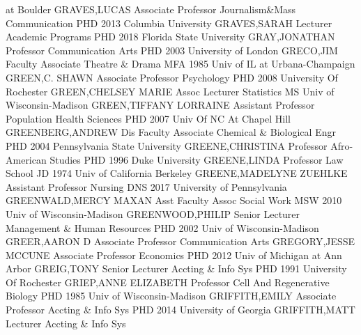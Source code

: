 \documentclass[
]{article}
\begin{document}
at Boulder \textbar GRAVES,LUCAS \textbar Associate Professor
\textbar Journalism\&Mass Communication \textbar{} 
\textbar PHD 2013 Columbia University \textbar GRAVES,SARAH
\textbar Lecturer \textbar Academic Programs \textbar{} 
\textbar PHD 2018 Florida State University \textbar GRAY,JONATHAN
\textbar Professor \textbar Communication Arts \textbar{} 
\textbar PHD 2003 University of London \textbar GRECO,JIM
\textbar Faculty Associate \textbar Theatre \& Drama \textbar{}
 \textbar MFA 1985 Univ of IL at Urbana-Champaign
\textbar GREEN,C. SHAWN \textbar Associate Professor \textbar Psychology
\textbar{}  \textbar PHD 2008 University Of Rochester
\textbar GREEN,CHELSEY MARIE \textbar Assoc Lecturer \textbar Statistics
\textbar{}  \textbar MS Univ of Wisconsin-Madison
\textbar GREEN,TIFFANY LORRAINE \textbar Assistant Professor
\textbar Population Health Sciences \textbar{}  \textbar PHD
2007 Univ Of NC At Chapel Hill \textbar GREENBERG,ANDREW \textbar Dis
Faculty Associate \textbar Chemical \& Biological Engr \textbar{}
 \textbar PHD 2004 Pennsylvania State University
\textbar GREENE,CHRISTINA \textbar Professor \textbar Afro-American
Studies \textbar{}  \textbar PHD 1996 Duke University
\textbar GREENE,LINDA \textbar Professor \textbar Law School \textbar{}
 \textbar JD 1974 Univ of California Berkeley
\textbar GREENE,MADELYNE ZUEHLKE \textbar Assistant Professor
\textbar Nursing \textbar{}  \textbar DNS 2017 University of
Pennsylvania \textbar GREENWALD,MERCY MAXAN \textbar Asst Faculty Assoc
\textbar Social Work \textbar{}  \textbar MSW 2010 Univ of
Wisconsin-Madison \textbar GREENWOOD,PHILIP \textbar Senior Lecturer
\textbar Management \& Human Resources \textbar{} 
\textbar PHD 2002 Univ of Wisconsin-Madison \textbar GREER,AARON D
\textbar Associate Professor \textbar Communication Arts \textbar{}
 \textbar GREGORY,JESSE MCCUNE \textbar Associate Professor
\textbar Economics \textbar PHD 2012 Univ of Michigan at Ann Arbor
\textbar{}  \textbar GREIG,TONY \textbar Senior Lecturer
\textbar Accting \& Info Sys \textbar PHD 1991 University Of Rochester
\textbar{}  \textbar GRIEP,ANNE ELIZABETH \textbar Professor
\textbar Cell And Regenerative Biology \textbar PHD 1985 Univ of
Wisconsin-Madison \textbar{}  \textbar GRIFFITH,EMILY
\textbar Associate Professor \textbar Accting \& Info Sys \textbar PHD
2014 University of Georgia \textbar{} 
\textbar GRIFFITH,MATT \textbar Lecturer \textbar Accting \& Info Sys
\end{document}
